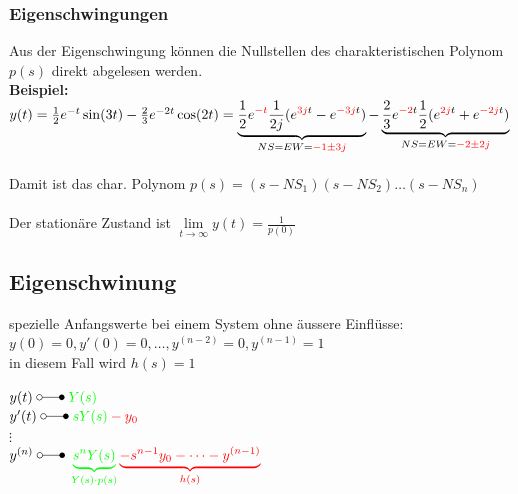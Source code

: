 		\subsubsection{Eigenschwingungen}
			Aus der Eigenschwingung können die Nullstellen des charakteristischen Polynom $p(s)$ 
			direkt abgelesen werden. \\
			\textbf{Beispiel:} \\
			$y(t) = \frac{1}{2} e^{-t} \sin(3t) - \frac{2}{3} e^{-2t} \cos(2t) = 
			\underbrace{\frac{1}{2} e^{\textcolor{red}{-t}} \frac{1}{2j}(e^{\textcolor{red}{3j}t}
			-e^{\textcolor{red}{-3j}t})}_{NS = EW = \textcolor{red}{-1 \pm 3j}} - 
			\underbrace{\frac{2}{3} e^{\textcolor{red}{-2}t} \frac{1}{2}(e^{\textcolor{red}{2j}t}
			+e^{\textcolor{red}{-2j}t})}_{NS = EW = \textcolor{red}{-2 \pm 2j}}$ \\\\
			Damit ist das char. Polynom $p(s) = (s-NS_1)(s-NS_2)\ldots(s-NS_n)$ \\\\
			Der stationäre Zustand ist $\lim\limits_{t\rightarrow\infty}y(t) = \frac{1}{p(0)}$ \\
				
		
	\subsection{Eigenschwinung}
		\begin{minipage}{12cm}
			spezielle Anfangswerte bei einem System ohne äussere Einflüsse:\\
			$y(0) = 0, y'(0) = 0, \dots , y^{(n-2)} = 0, y^{(n-1)} = 1$\\
			in diesem Fall wird $h(s) = 1$\\
		\end{minipage}
		\begin{minipage}{6cm}
			$y(t) \; \laplace \; \color{green} Y(s)$\\
			$y'(t) \; \laplace \; \color{green} sY(s)\color{red} - y_0$\\
			$\vdots$\\
			$y^{(n)} \; \laplace \; 
			\color{green}\underbrace{s^nY(s)}_{Y(s) \cdot p(s)}
			\color{red}\underbrace{-s^{n-1}y_0 - \dots - y^{(n-1)}}_{h(s)}$
		\end{minipage}